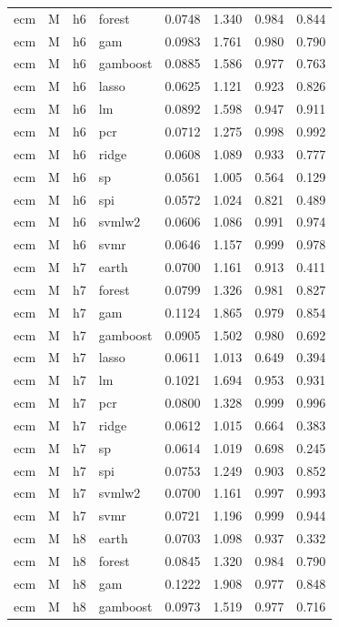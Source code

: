 \begin{ThreePartTable}
\begin{longtable}[t]{llclcccc}
ecm & M & h6 & forest & 0.0748 & 1.340 & 0.984 & 0.844\\
ecm & M & h6 & gam & 0.0983 & 1.761 & 0.980 & 0.790\\
ecm & M & h6 & gamboost & 0.0885 & 1.586 & 0.977 & 0.763\\
ecm & M & h6 & lasso & 0.0625 & 1.121 & 0.923 & 0.826\\
ecm & M & h6 & lm & 0.0892 & 1.598 & 0.947 & 0.911\\
ecm & M & h6 & pcr & 0.0712 & 1.275 & 0.998 & 0.992\\
ecm & M & h6 & ridge & 0.0608 & 1.089 & 0.933 & 0.777\\
ecm & M & h6 & sp & 0.0561 & 1.005 & 0.564 & 0.129\\
ecm & M & h6 & spi & 0.0572 & 1.024 & 0.821 & 0.489\\
ecm & M & h6 & svmlw2 & 0.0606 & 1.086 & 0.991 & 0.974\\
ecm & M & h6 & svmr & 0.0646 & 1.157 & 0.999 & 0.978\\
\addlinespace
ecm & M & h7 & earth & 0.0700 & 1.161 & 0.913 & 0.411\\
ecm & M & h7 & forest & 0.0799 & 1.326 & 0.981 & 0.827\\
ecm & M & h7 & gam & 0.1124 & 1.865 & 0.979 & 0.854\\
ecm & M & h7 & gamboost & 0.0905 & 1.502 & 0.980 & 0.692\\
ecm & M & h7 & lasso & 0.0611 & 1.013 & 0.649 & 0.394\\
ecm & M & h7 & lm & 0.1021 & 1.694 & 0.953 & 0.931\\
ecm & M & h7 & pcr & 0.0800 & 1.328 & 0.999 & 0.996\\
ecm & M & h7 & ridge & 0.0612 & 1.015 & 0.664 & 0.383\\
ecm & M & h7 & sp & 0.0614 & 1.019 & 0.698 & 0.245\\
ecm & M & h7 & spi & 0.0753 & 1.249 & 0.903 & 0.852\\
ecm & M & h7 & svmlw2 & 0.0700 & 1.161 & 0.997 & 0.993\\
ecm & M & h7 & svmr & 0.0721 & 1.196 & 0.999 & 0.944\\
\addlinespace
ecm & M & h8 & earth & 0.0703 & 1.098 & 0.937 & 0.332\\
ecm & M & h8 & forest & 0.0845 & 1.320 & 0.984 & 0.790\\
ecm & M & h8 & gam & 0.1222 & 1.908 & 0.977 & 0.848\\
ecm & M & h8 & gamboost & 0.0973 & 1.519 & 0.977 & 0.716\\

\end{longtable}
\end{ThreePartTable}
